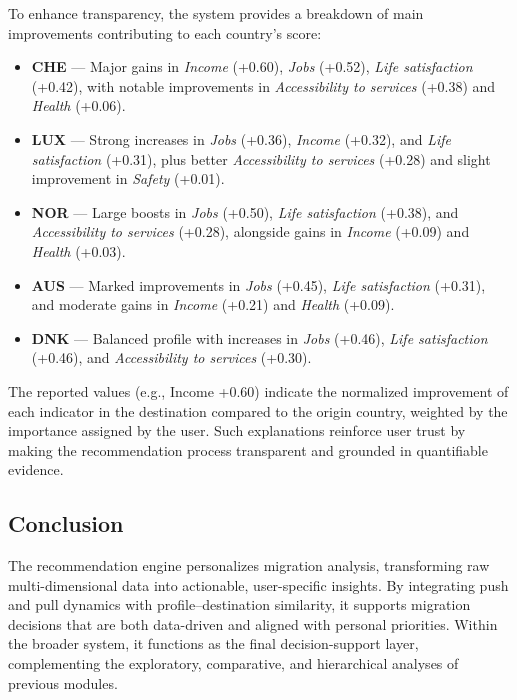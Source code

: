 \documentclass[11pt]{article}
\begin{document}
\noindent
To enhance transparency, the system provides a breakdown of main improvements contributing to each country’s score:
\begin{itemize}
    \item \textbf{CHE} — Major gains in \emph{Income} (+0.60), \emph{Jobs} (+0.52), \emph{Life satisfaction} (+0.42), with notable improvements in \emph{Accessibility to services} (+0.38) and \emph{Health} (+0.06).
    \item \textbf{LUX} — Strong increases in \emph{Jobs} (+0.36), \emph{Income} (+0.32), and \emph{Life satisfaction} (+0.31), plus better \emph{Accessibility to services} (+0.28) and slight improvement in \emph{Safety} (+0.01).
    \item \textbf{NOR} — Large boosts in \emph{Jobs} (+0.50), \emph{Life satisfaction} (+0.38), and \emph{Accessibility to services} (+0.28), alongside gains in \emph{Income} (+0.09) and \emph{Health} (+0.03).
    \item \textbf{AUS} — Marked improvements in \emph{Jobs} (+0.45), \emph{Life satisfaction} (+0.31), and moderate gains in \emph{Income} (+0.21) and \emph{Health} (+0.09).
    \item \textbf{DNK} — Balanced profile with increases in \emph{Jobs} (+0.46), \emph{Life satisfaction} (+0.46), and \emph{Accessibility to services} (+0.30).
\end{itemize}

\noindent
The reported values (e.g., Income +0.60) indicate the normalized improvement of each indicator in the destination compared to the origin country, weighted by the importance assigned by the user.
Such explanations reinforce user trust by making the recommendation process transparent and grounded in quantifiable evidence.

\subsection{Conclusion}

\noindent
The recommendation engine personalizes migration analysis, transforming raw multi-dimensional data into actionable, user-specific insights. By integrating push and pull dynamics with profile–destination similarity, it supports migration decisions that are both data-driven and aligned with personal priorities. Within the broader system, it functions as the final decision-support layer, complementing the exploratory, comparative, and hierarchical analyses of previous modules.
\end{document}
